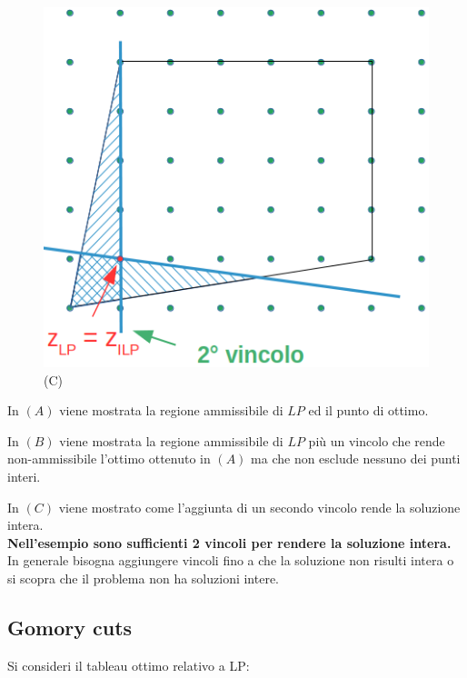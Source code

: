 \begin{figure}[!htb]
	\includegraphics[width=\linewidth]{images/graph11.png}
	(C)
	\label{fig:paniditaglio3}
	\endminipage
\end{figure}

In $(A)$ viene mostrata la regione ammissibile di $LP$ ed il punto di ottimo.

In $(B)$ viene mostrata la regione ammissibile di $LP$ più un vincolo che rende non-ammissibile l'ottimo ottenuto in $(A)$ ma che non esclude nessuno dei punti interi.

In $(C)$ viene mostrato come l'aggiunta di un secondo vincolo rende la soluzione intera.\\
\textbf{Nell'esempio sono sufficienti 2 vincoli per rendere la soluzione intera.}
In generale bisogna aggiungere vincoli fino a che la soluzione non risulti intera o si scopra che il problema non ha soluzioni intere.

\subsection{Gomory cuts}
Si consideri il tableau ottimo relativo a LP:

